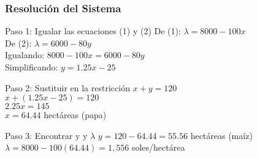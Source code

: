 \documentclass{beamer}
\begin{document}
\begin{frame}
\frametitle{Resolución del Sistema}

\begin{block}{Paso 1: Igualar las ecuaciones (1) y (2)}
De (1): $\lambda = 8000 - 100x$ \\
De (2): $\lambda = 6000 - 80y$ \\[0.2cm]
Igualando: $8000 - 100x = 6000 - 80y$ \\
Simplificando: $y = 1.25x - 25$
\end{block}

\begin{block}{Paso 2: Sustituir en la restricción}
$x + y = 120$ \\
$x + (1.25x - 25) = 120$ \\
$2.25x = 145$ \\
$x = 64.44$ hectáreas (papa)
\end{block}

\begin{block}{Paso 3: Encontrar y y $\lambda$}
$y = 120 - 64.44 = 55.56$ hectáreas (maíz) \\
$\lambda = 8000 - 100(64.44) = 1,556$ soles/hectárea
\end{block}

\end{frame}
\end{document}
